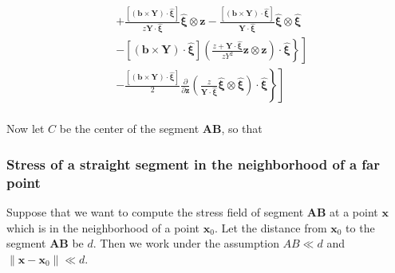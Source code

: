 \documentclass[10pt]{report}
\begin{document}
{\begin{align}
&+\frac{\left[\left(\bm b\times\bm Y\right)\cdot\hat{\bm \xi}\right]}{z\bm Y\cdot \hat{\bm \xi}}\hat{\bm\xi}\otimes\bm z
-\frac{\left[\left(\bm b\times\bm Y\right)\cdot\hat{\bm \xi}\right]}{\bm Y\cdot \hat{\bm \xi}}\hat{\bm\xi}\otimes\hat{\bm \xi}\nonumber\\
&\left.\left.-\left[\left(\bm b\times\bm Y\right)\cdot\hat{\bm \xi}\right]\left(\frac{z+\bm Y\cdot \hat{\bm \xi}}{zY^2}\bm z\otimes\bm z\right)\cdot\hat{\bm \xi}\right\}\right]\nonumber\\
&\left.\left.-\frac{\left[\left(\bm b\times\bm Y\right)\cdot\hat{\bm \xi}\right]}{2}\frac{\partial}{\partial \bm z}\left(\frac{z}{\bm Y\cdot \hat{\bm \xi}}\hat{\bm\xi}\otimes\hat{\bm\xi}\right)\cdot\hat{\bm \xi}\right\}\right]\nonumber\\
\end{align}

Now let $C$ be the center of the segment $\bm A\bm B$, so that  


\subsubsection{Stress of a straight segment in the neighborhood of a far point}

Suppose that we want to compute the stress field of segment $\bm A\bm B$ at a point $\bm x$ which is in the neighborhood of a point $\bm x_0$. Let the distance from $\bm x_0$ to the segment $\bm A\bm B$ be $d$. Then we work under the assumption $AB\ll d$ and $\|\bm x-\bm x_0\|\ll d$. 



}
\end{document}
